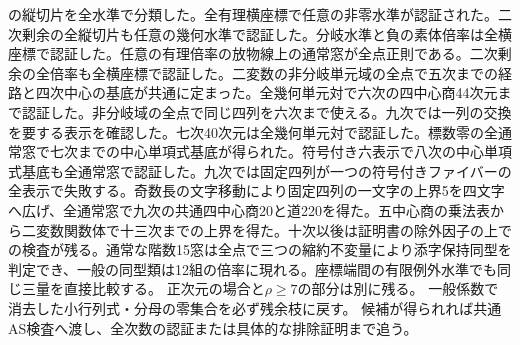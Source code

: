 \documentclass[11pt,a4paper]{ltjsarticle}
\begin{document}
の縦切片を全水準で分類した。全有理横座標で任意の非零水準が認証された。二次剰余の全縦切片も任意の幾何水準で認証した。分岐水準と負の素体倍率は全横座標で認証した。任意の有理倍率の放物線上の通常窓が全点正則である。二次剰余の全倍率も全横座標で認証した。二変数の非分岐単元域の全点で五次までの経路と四次中心の基底が共通に定まった。全幾何単元対で六次の四中心商44次元まで認証した。非分岐域の全点で同じ四列を六次まで使える。九次では一列の交換を要する表示を確認した。七次40次元は全幾何単元対で認証した。標数零の全通常窓で七次までの中心単項式基底が得られた。符号付き六表示で八次の中心単項式基底も全通常窓で認証した。九次では固定四列が一つの符号付きファイバーの全表示で失敗する。奇数長の文字移動により固定四列の一文字の上界5を四文字へ広げ、全通常窓で九次の共通四中心商20と道220を得た。五中心商の乗法表から二変数関数体で十三次までの上界を得た。十次以後は証明書の除外因子の上での検査が残る。通常な階数15窓は全点で三つの縮約不変量により添字保持同型を判定でき、一般の同型類は12組の倍率に現れる。座標端間の有限例外水準でも同じ三量を直接比較する。
正次元の場合と$\rho\ge7$の部分は別に残る。
一般係数で消去した小行列式・分母の零集合を必ず残余枝に戻す。
候補が得られれば共通AS検査へ渡し、全次数の認証または具体的な排除証明まで追う。
\end{document}
